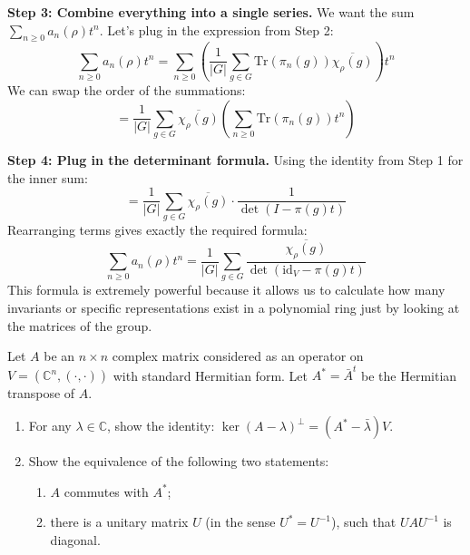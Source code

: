 \begin{solution}
\textbf{Step 3: Combine everything into a single series.}
We want the sum $\sum_{n \geq 0} a_n(\rho) t^n$. Let's plug in the expression from Step 2:
\[ \sum_{n \geq 0} a_n(\rho) t^n = \sum_{n \geq 0} \left( \frac{1}{|G|} \sum_{g \in G} \text{Tr}(\pi_n(g)) \overline{\chi_\rho(g)} \right) t^n \]
We can swap the order of the summations:
\[ = \frac{1}{|G|} \sum_{g \in G} \overline{\chi_\rho(g)} \left( \sum_{n \geq 0} \text{Tr}(\pi_n(g)) t^n \right) \]

\textbf{Step 4: Plug in the determinant formula.}
Using the identity from Step 1 for the inner sum:
\[ = \frac{1}{|G|} \sum_{g \in G} \overline{\chi_\rho(g)} \cdot \frac{1}{\det(I - \pi(g) t)} \]
Rearranging terms gives exactly the required formula:
\[ \sum_{n \geq 0} a_n(\rho) t^n = \frac{1}{|G|} \sum_{g \in G} \frac{\overline{\chi_\rho(g)}}{\det(\mathrm{id}_V - \pi(g) t)} \]
This formula is extremely powerful because it allows us to calculate how many invariants or specific representations exist in a polynomial ring just by looking at the matrices of the group.
\end{solution}

\begin{exercise}
\label{algebra:2015:10}
Let $A$ be an $n \times n$ complex matrix considered as an operator on $V = (\mathbb{C}^n, (\cdot, \cdot))$ with standard Hermitian form. Let $A^* = \bar{A}^t$ be the Hermitian transpose of $A$.
\begin{enumerate}
    \item For any $\lambda \in \mathbb{C}$, show the identity: $\ker(A - \lambda)^\perp = (A^* - \bar{\lambda})V$.
    \item Show the equivalence of the following two statements:
    \begin{enumerate}
        \item $A$ commutes with $A^*$;
        \item there is a unitary matrix $U$ (in the sense $U^* = U^{-1}$), such that $UAU^{-1}$ is diagonal.
    \end{enumerate}
\end{enumerate}
\end{exercise}

